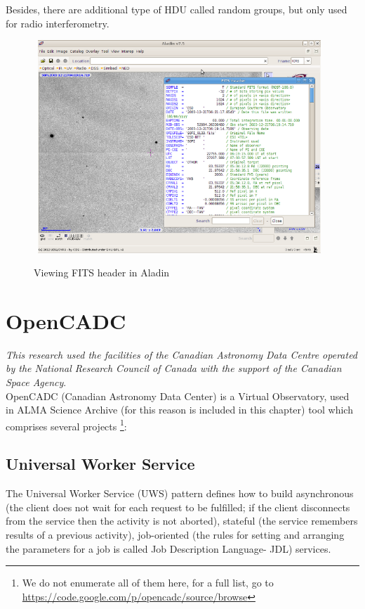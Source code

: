 Besides, there are additional type of HDU called random groups, but only used for radio interferometry.
      
\begin{figure}[H]
\centering
\includegraphics[width=11cm,height=8cm]{images/fits_header.png}\\
\caption{Viewing FITS header in Aladin}
\end{figure}


\section{OpenCADC}

\textit{This research used the facilities of the Canadian Astronomy Data Centre operated 
by the National Research Council of Canada with the support of the Canadian Space Agency}.\\

OpenCADC (Canadian Astronomy Data Center) is a Virtual Observatory, used in ALMA Science Archive (for this reason is included in this chapter) tool which comprises several projects \footnote{We do not enumerate all of them here, for a full list, go to \url{https://code.google.com/p/opencadc/source/browse}}:

\subsection{Universal Worker Service}

The Universal Worker Service (UWS) pattern defines how to build asynchronous (the client does not wait for each request to be fulfilled; if the client disconnects from the service then the activity is not aborted), stateful (the service remembers results of a previous activity), job-oriented (the rules for setting and arranging the parameters for a job is called Job Description Language- JDL) services.

